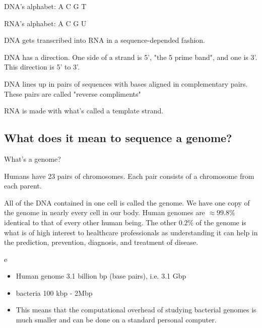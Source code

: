 DNA's alphabet: A C  G T

RNA's alphabet:  A C G U

DNA gets transcribed into RNA in a sequence-depended fashion.

DNA has a direction. One side of a strand is 5', "the 5 prime band", and one is 3'. This direction is 5' to 3'.

DNA lines up in pairs of sequences with bases aligned in complementary pairs. These pairs are called "reverse compliments"

RNA is made with what's called a template strand.

\subsection{What does it mean to sequence a genome?}

\begin{quest}
\item
	What's a genome?

	\begin{ans}
		Humans have 23 pairs of chromosomes. Each pair consists of a chromosome from each parent.

		All of the DNA contained in one cell is called the genome. We have one copy of the genome in nearly every cell in our body. Human genomes are $\approx99.8\%$  identical to that of every other human being. The other $0.2\%$ of the genome is what is of high interest to healthcare professionals as understanding it can help in the prediction, prevention, diagnosis, and treatment of disease.
	\end{ans}

\item
	e

\end{quest}

\begin{itemize}
	\item Human genome 3.1 billion bp (base pairs), i.e. 3.1 Gbp
	\item bacteria 100 kbp - 2Mbp
	\item This means that the computational overhead of studying bacterial genomes is much smaller and can be done on a standard personal computer.
\end{itemize}





